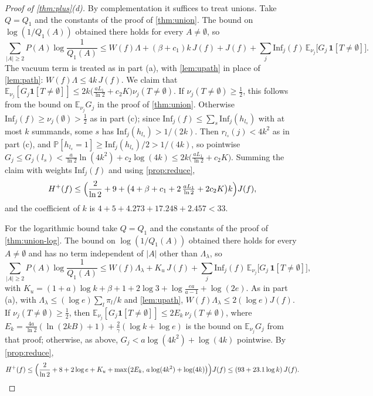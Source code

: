 \documentclass[11pt]{amsart}
\theoremstyle{definition}
\theoremstyle{remark}
\newcommand{\E}{\mathbb{E}}
\renewcommand{\Pr}{\mathbb{P}}
\newcommand{\Inf}{\mathrm{Inf}}
\begin{document}
\begin{proof}[Proof of \cref{thm:plus}\textup{(d)}]
By complementation it suffices to treat unions. Take $Q=Q_1$ and the constants of the proof of \cref{thm:union}.
The bound on $\log(1/Q_1(A))$ obtained there holds for every $A\ne\emptyset$, so
\[
\sum_{|A|\ge2}P(A)\log\frac1{Q_1(A)}\le W(f)\Lambda+(\beta+c_1)k\,J(f)+J(f)
+\sum_j\Inf_j(f)\,\E_{\nu_j}\bigl[G_j\,\mathbf 1[T\ne\emptyset]\bigr].
\]
The vacuum term is treated as in part (a), with \cref{lem:upath} in place of \cref{lem:path}:
$W(f)\Lambda\le4k\,J(f)$. We claim that
$\E_{\nu_j}[G_j\mathbf 1[T\ne\emptyset]]\le2k\bigl(\frac{aL_1}{\ln2}+c_2K\bigr)\nu_j(T\ne\emptyset)$. If
$\nu_j(T\ne\emptyset)\ge\frac12$, this follows from the bound on $\E_{\nu_j}G_j$ in the proof of \cref{thm:union}.
Otherwise $\Inf_j(f)\ge\nu_j(\emptyset)>\frac12$ as in part (c); since $\Inf_j(f)\le\sum_s\Inf_j(h_{l_s})$ with at most
$k$ summands, some $s$ has $\Inf_j(h_{l_s})>1/(2k)$. Then $r_{l_s}(j)<4k^2$ as in part (c), and
$\Pr[h_{l_s}=1]\ge\Inf_j(h_{l_s})/2>1/(4k)$, so pointwise
$G_j\le G_j(l_s)<\frac a{\ln2}\ln(4k^2)+c_2\log(4k)\le2k\bigl(\frac{aL_1}{\ln2}+c_2K\bigr)$. Summing the claim with
weights $\Inf_j(f)$ and using \cref{prop:reduce},
\[
H^+(f)\le\Bigl(\frac2{\ln2}+9+\bigl(4+\beta+c_1+2\,\tfrac{aL_1}{\ln2}+2c_2K\bigr)k\Bigr)J(f),
\]
and the coefficient of $k$ is $4+5+4.273+17.248+2.457<33$.

For the logarithmic bound take $Q=Q_1$ and the constants of the proof of \cref{thm:union-log}. The bound on
$\log(1/Q_1(A))$ obtained there holds for every $A\ne\emptyset$ and has no term independent of $|A|$ other than
$\Lambda_\lambda$, so
\[
\sum_{|A|\ge2}P(A)\log\frac1{Q_1(A)}\le W(f)\Lambda_\lambda+K_u\,J(f)+\sum_j\Inf_j(f)\,\E_{\nu_j}\bigl[G_j\,\mathbf
1[T\ne\emptyset]\bigr],
\]
with $K_u=(1+a)\log k+\beta+1+2\log3+\log\frac{ea}{a-1}+\log(2e)$. As in part (a), with $\Lambda_\lambda\le(\log e)
\sum_l\pi_l/k$ and \cref{lem:upath}, $W(f)\Lambda_\lambda\le2(\log e)J(f)$. If $\nu_j(T\ne\emptyset)\ge\frac12$, then
$\E_{\nu_j}[G_j\mathbf1[T\ne\emptyset]]\le2E_k\,\nu_j(T\ne\emptyset)$, where $E_k=\frac{4a}{\ln2}(\ln(2kB)+1)+\frac2\gamma
(\log k+\log e)$ is the bound on $\E_{\nu_j}G_j$ from that proof; otherwise, as above, $G_j<a\log(4k^2)+\log(4k)$
pointwise. By \cref{prop:reduce},
\[
H^+(f)\le\Bigl(\frac2{\ln2}+8+2\log e+K_u+\max\bigl(2E_k,\,a\log(4k^2)+\log(4k)\bigr)\Bigr)J(f)
\le(93+23.1\log k)\,J(f).
\]
\end{proof}
\end{document}
